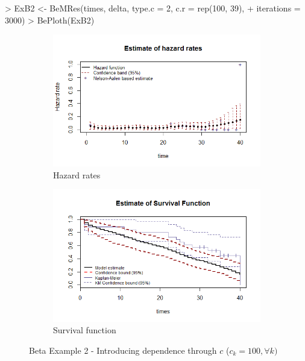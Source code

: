 \documentclass[letterpaper]{article}
\begin{document}
\begin{Schunk}
\begin{Sinput}
> ExB2 <- BeMRes(times, delta, type.c = 2, c.r = rep(100, 39), 
+                iterations = 3000)
> BePloth(ExB2)
\end{Sinput}
\end{Schunk}

\begin{figure}
  \centering
  \begin{subfigure}[a]{\textwidth}\centering
    \includegraphics[width=\textwidth]{B21.png}
    \caption{Hazard rates}
  \end{subfigure}
  \begin{subfigure}[b]{\textwidth}\centering
    \includegraphics[width=\textwidth]{B22.png}
    \caption{Survival function}
  \end{subfigure}
  \caption{Beta Example 2 - Introducing dependence through $c$ ($c_k=100, \forall k)$}
  \label{fig:B2}
\end{figure}
\end{document}
